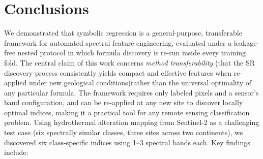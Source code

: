 \documentclass[preprint,authoryear,number]{elsarticle}
\begin{document}
\section{Conclusions}
\label{sec:conclusions}

We demonstrated that symbolic regression is a general-purpose, transferable framework for automated spectral feature engineering, evaluated under a leakage-free nested protocol in which formula discovery is re-run inside every training fold. The central claim of this work concerns \emph{method transferability} (that the SR discovery process consistently yields compact and effective features when re-applied under new geological conditions)rather than the universal optimality of any particular formula. The framework requires only labeled pixels and a sensor's band configuration, and can be re-applied at any new site to discover locally optimal indices, making it a practical tool for any remote sensing classification problem. Using hydrothermal alteration mapping from Sentinel-2 as a challenging test case (six spectrally similar classes, three sites across two continents), we discovered six class-specific indices using 1--3 spectral bands each. Key findings include:
\end{document}
